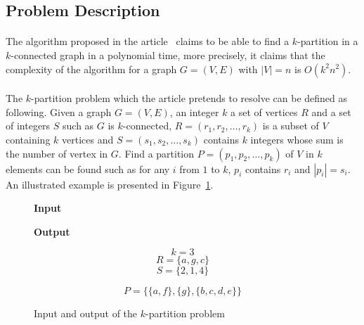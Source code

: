 \subsection{Problem Description}
\paragraph{}
The algorithm proposed in the article~\cite{JS94} claims to be able to find
a $k$-partition in a $k$-connected graph in a polynomial time, more precisely,
it claims that the complexity of the algorithm for a graph $G = (V,E)$ with
$|V| = n$ is $O(k^2 n^2)$.

\paragraph{}
The $k$-partition problem which the article pretends to resolve can be
defined as following. Given a graph $G = (V,E)$, an integer $k$ a set
of vertices $R$ and a set of integers $S$ such as $G$ is $k$-connected,
$R = (r_1, r_2, \dots, r_k )$ is a subset of $V$ containing $k$ vertices and
$S = (s_1, s_2, \dots, s_k )$ contains $k$ integers whose sum is the number of
vertex in $G$. Find a partition $P = (p_1, p_2, \dots, p_k)$ of $V$ in $k$
elements can be found such as for any $i$ from $1$ to $k$, $p_i$ contains
$r_i$ and $|p_i| = s_i$. An illustrated example is presented in
Figure~\ref{fig:inputOutput}.

\newcommand{\formalTitle}[1]{\textbf{\large #1}\vspace{0.5cm}}

\begin{figure}[H]
  \caption{\label{fig:inputOutput}Input and output of the $k$-partition
    problem}
  \vspace{0.5cm}
  \begin{minipage}{.5\textwidth}
    \begin{center}
      \formalTitle{Input}\\
      \begin{tikzpicture}[x=.06\textwidth, y=.06\textwidth,transform shape]
        
      \end{tikzpicture}
    \end{center}
  \end{minipage}
  \begin{minipage}{.5\textwidth}
    \begin{center}
      \formalTitle{Output}\\
      \begin{tikzpicture}[x=.06\textwidth, y=.06\textwidth,transform shape]
        
      \end{tikzpicture}
    \end{center}
  \end{minipage}
  \begin{minipage}{.5\textwidth}
    $$k = 3$$
    $$R = \{a,g,c\}$$
    $$S = \{2,1,4\}$$
  \end{minipage}
  \begin{minipage}{.5\textwidth}
    $$P = \big\{\{a, f\},\{g\},\{b, c, d, e\}\big\}$$
  \end{minipage}
\end{figure}

